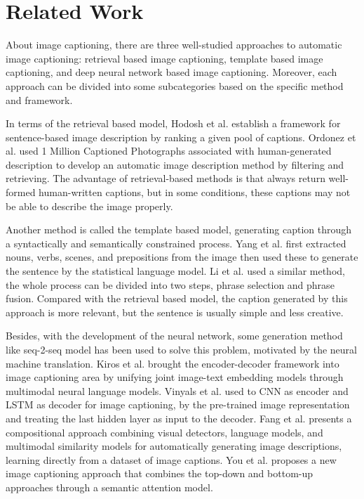 \documentclass{article}
\begin{document}
\section{Related Work}
About image captioning, there are three well-studied approaches to automatic image captioning: retrieval based image captioning, template based image captioning, and deep neural network based image captioning\cite{survey2018}. Moreover, each approach can be divided into some subcategories based on the specific method and framework.

In terms of the retrieval based model, Hodosh et al.\cite{hodosh2013framing} establish a framework for sentence-based image description by ranking a given pool of captions. Ordonez et al.\cite{ordonez2011im2text} used 1 Million Captioned Photographs associated with human-generated description to develop an automatic image description method by filtering and retrieving. The advantage of retrieval-based methods is that always return well-formed human-written captions, but in some conditions, these captions may not be able to describe the image properly.

Another method is called the template based model, generating caption through a syntactically and semantically constrained process. Yang et al.\cite{yang2011corpus} first extracted nouns, verbs, scenes, and prepositions from the image then used these to generate the sentence by the statistical language model. Li et al.\cite{li2011composing} used a similar method, the whole process can be divided into two steps, phrase selection and phrase fusion. Compared with the retrieval based model, the caption generated by this approach is more relevant, but the sentence is usually simple and less creative.

Besides, with the development of the neural network, some generation method like seq-2-seq model has been used to solve this problem, motivated by the neural machine translation. Kiros et al. \cite{kiros2014unifying} brought the encoder-decoder framework into
image captioning area by unifying joint image-text embedding
models through multimodal neural language models. Vinyals et al.\cite{vinyals2015show} used to CNN as encoder and LSTM as decoder for image captioning, by the pre-trained image representation and treating the last hidden layer as input to the decoder. Fang et al.\cite{fang2015captions} presents a compositional approach combining visual detectors, language models, and multimodal similarity models for automatically generating image descriptions, learning directly from a dataset of image captions. You et al.\cite{you2016image} proposes a new image captioning approach that combines the top-down and bottom-up approaches through a semantic attention model. 
\end{document}
